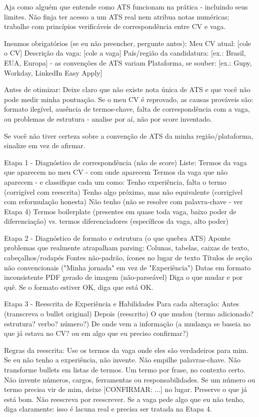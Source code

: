 \documentclass[11pt, a4paper]{article}
\begin{document}
\begin{promptbox}
Aja como alguém que entende como ATS funcionam na prática - incluindo seus limites. Não finja ter acesso a um ATS real nem atribua notas numéricas; trabalhe com princípios verificáveis de correspondência entre CV e vaga.
	
Insumos obrigatórios (se eu não preencher, pergunte antes):
 Meu CV atual: [cole o CV]
 Descrição da vaga: [cole a vaga]
 País/região da candidatura: [ex.: Brasil, EUA, Europa] - as convenções de ATS variam
 Plataforma, se souber: [ex.: Gupy, Workday, LinkedIn Easy Apply]

Antes de otimizar:
 Deixe claro que não existe nota única de ATS e que você não pode medir minha pontuação. Se o meu CV é reprovado, as causas prováveis são: formato ilegível, ausência de termos-chave, falta de correspondência com a vaga, ou problemas de estrutura - analise por aí, não por score inventado.
	
Se você não tiver certeza sobre a convenção de ATS da minha região/plataforma, sinalize em vez de afirmar.
	
Etapa 1 - Diagnóstico de correspondência (não de score)
Liste:
 Termos da vaga que aparecem no meu CV - com onde aparecem
 Termos da vaga que não aparecem - e classifique cada um como:
 Tenho experiência, falta o termo (corrigível com reescrita)
 Tenho algo próximo, mas não equivalente (corrigível com reformulação honesta)
 Não tenho (não se resolve com palavra-chave - ver Etapa 4)
 Termos boilerplate (presentes em quase toda vaga, baixo poder de diferenciação) vs. termos diferenciadores (específicos da vaga, alto poder)
	
Etapa 2 - Diagnóstico de formato e estrutura (o que quebra ATS)
 Aponte problemas que realmente atrapalham parsing:
 Colunas, tabelas, caixas de texto, cabeçalhos/rodapés
 Fontes não-padrão, ícones no lugar de texto
 Títulos de seção não convencionais ("Minha jornada" em vez de "Experiência")
 Datas em formato inconsistente
 PDF gerado de imagem (não-parseável)
 Diga o que mudar e por quê. Se o formato estiver OK, diga que está OK.
	
Etapa 3 - Reescrita de Experiência e Habilidades
Para cada alteração:
 Antes (transcreva o bullet original)
 Depois (reescrito)
 O que mudou (termo adicionado? estrutura? verbo? número?)
 De onde vem a informação (a mudança se baseia no que já estava no CV? ou em algo que eu preciso confirmar?)
	
Regras da reescrita:
 Use os termos da vaga onde eles são verdadeiros para mim. Se eu não tenho a experiência, não invente.
 Não empilhe palavras-chave. 
 Não transforme bullets em listas de termos. Um termo por frase, no contexto certo.
 Não invente números, cargos, ferramentas ou responsabilidades. Se um número ou termo precisa vir de mim, deixe [CONFIRMAR: ...] no lugar.
 Preserve o que já está bom. Não reescreva por reescrever.
 Se a vaga pede algo que eu não tenho, diga claramente: isso é lacuna real e precisa ser tratada na Etapa 4.
	

\end{promptbox}
\end{document}
